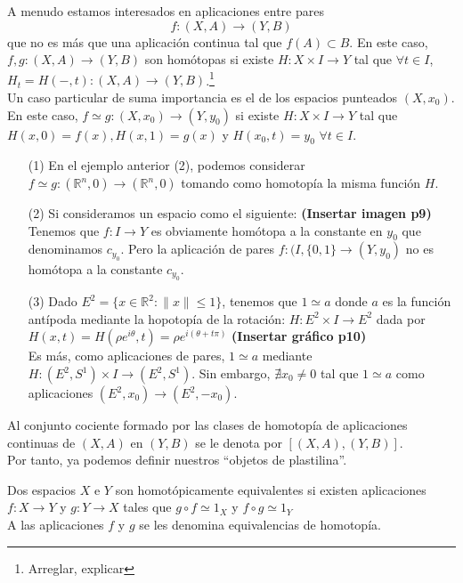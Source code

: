 A menudo estamos interesados en aplicaciones entre pares
$$f : (X, A) \longrightarrow (Y, B)$$ que no es más que una aplicación continua tal que $f(A) \subset B$. En este caso, $f, g : (X, A) \longrightarrow (Y, B)$ son homótopas si existe $H : X \times I \longrightarrow Y$ tal que $\forall t \in I$, $H_t = H(-, t) : (X, A) \longrightarrow (Y, B)$.\footnote{Arreglar, explicar}\\
Un caso particular de suma importancia es el de los espacios punteados $(X, x_0)$. En este caso, $f \simeq g : (X, x_0) \longrightarrow (Y, y_0)$ si existe $H: X \times I \longrightarrow Y$ tal que $H(x, 0) = f(x), H(x, 1) = g(x)$ y $H(x_0, t) = y_0$ $\forall t \in I$.\\
\begin{ejems}
\begin{itemize}
\item[(1)] En el ejemplo anterior (2), podemos considerar $f \simeq g : (\mathbb{R}^n, 0) \longrightarrow (\mathbb{R}^n, 0)$ tomando como homotopía la misma función $H$.
\item[(2)] Si consideramos un espacio como el siguiente: \textbf{(Insertar imagen p9)} Tenemos que $f : I \longrightarrow Y$ es obviamente homótopa a la constante en $y_0$ que denominamos $c_{y_0}$. Pero la aplicación de pares $f : (I, \{ 0,1 \} \longrightarrow (Y, y_0)$ no es homótopa a la constante $c_{y_0}$.
\item[(3)] Dado $E^2 = \{ x \in \mathbb{R}^2 : \| x \| \leq 1 \}$, tenemos que $1 \simeq a$ donde $a$ es la función antípoda mediante la hopotopía de la rotación: $H : E^2 \times I \longrightarrow E^2$ dada por $H(x, t) = H(\rho e^{i\theta}, t) = \rho e^{i(\theta + t\pi)}$ \textbf{(Insertar gráfico p10)}\\
Es más, como aplicaciones de pares, $1 \simeq a$ mediante $H : (E^2, S^1) \times I \longrightarrow (E^2, S^1)$. Sin embargo, $\nexists x_0 \neq 0$ tal que $1 \simeq a$ como aplicaciones $(E^2, x_0) \longrightarrow (E^2, -x_0)$.
\end{itemize}
\end{ejems}
Al conjunto cociente formado por las clases de homotopía de aplicaciones continuas de $(X, A)$ en $(Y, B)$ se le denota por $[(X, A), (Y, B)]$.\\
Por tanto, ya podemos definir nuestros ``objetos de plastilina''.
\begin{defin}
Dos espacios $X$ e $Y$ son homotópicamente equivalentes si existen aplicaciones $f: X \longrightarrow Y$ y $g: Y \longrightarrow X$ tales que $g \circ f \simeq 1_X$ y $f \circ g \simeq 1_Y$ \\
A las aplicaciones $f$ y $g$ se les denomina equivalencias de homotopía.
\end{defin}

